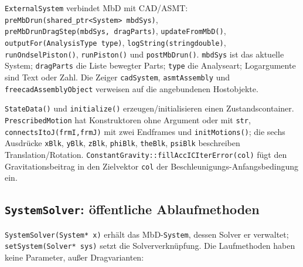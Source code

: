 \documentclass[
  12pt
]{book}
\begin{document}
\texttt{ExternalSystem} verbindet MbD mit CAD/ASMT:
\texttt{preMbDrun(shared\_ptr\textless{}System\textgreater{}\ mbdSys)},
\texttt{preMbDrunDragStep(mbdSys,\ dragParts)},
\texttt{updateFromMbD()}, \texttt{outputFor(AnalysisType\ type)},
\texttt{logString(string\textbar{}double)}, \texttt{runOndselPiston()},
\texttt{runPiston()} und \texttt{postMbDrun()}. \texttt{mbdSys} ist das
aktuelle System; \texttt{dragParts} die Liste bewegter Parts;
\texttt{type} die Analyseart; Logargumente sind Text oder Zahl. Die
Zeiger \texttt{cadSystem}, \texttt{asmtAssembly} und
\texttt{freecadAssemblyObject} verweisen auf die angebundenen
Hostobjekte.

\texttt{StateData()} und \texttt{initialize()} erzeugen/initialisieren
einen Zustandscontainer. \texttt{PrescribedMotion} hat Konstruktoren
ohne Argument oder mit \texttt{str}, \texttt{connectsItoJ(frmI,frmJ)}
mit zwei Endframes und \texttt{initMotions()}; die sechs Ausdrücke
\texttt{xBlk}, \texttt{yBlk}, \texttt{zBlk}, \texttt{phiBlk},
\texttt{theBlk}, \texttt{psiBlk} beschreiben Translation/Rotation.
\texttt{ConstantGravity::fillAccICIterError(col)} fügt den
Gravitationsbeitrag in den Zielvektor \texttt{col} der
Beschleunigungs-Anfangsbedingung ein.

\hypertarget{systemsolver-uxf6ffentliche-ablaufmethoden}{%
\subsection*{\texorpdfstring{\texttt{SystemSolver}: öffentliche
Ablaufmethoden}{SystemSolver: öffentliche Ablaufmethoden}}\label{systemsolver-uxf6ffentliche-ablaufmethoden}}

\texttt{SystemSolver(System*\ x)} erhält das MbD-\texttt{System}, dessen
Solver er verwaltet; \texttt{setSystem(Solver*\ sys)} setzt die
Solververknüpfung. Die Laufmethoden haben keine Parameter, außer
Dragvarianten:
\end{document}

